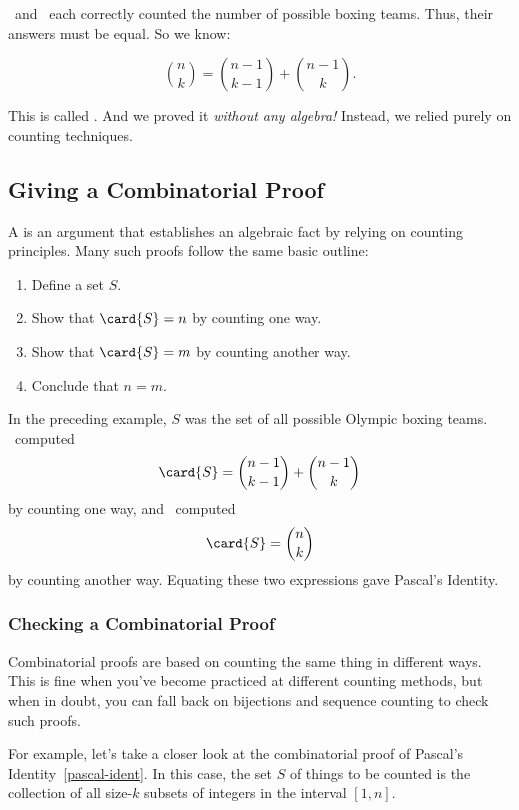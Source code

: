 \Jer\ and \Jay\ each correctly counted the number of possible boxing
teams.  Thus, their answers must be equal.  So we know:
%
\begin{lemma}
\begin{equation}\label{pascal-ident}
    \binom{n}{k} = \binom{n-1}{k-1} + \binom{n - 1}{k}.
\end{equation}
\end{lemma}
%
This is called .  And we proved it
\emph{without any algebra!}  Instead, we relied purely on counting
techniques.


\subsection{Giving a Combinatorial Proof}

A  is an argument that establishes an
algebraic fact by relying on counting principles.  Many such proofs
follow the same basic outline:
%
\begin{enumerate}

\item Define a set $S$.

\item Show that $\card{S} = n$ by counting one way.

\item Show that $\card{S} = m$ by counting another way.

\item Conclude that $n = m$.

\end{enumerate}
%
In the preceding example, $S$ was the set of all possible Olympic boxing
teams.  \Jay\ computed
\[
\card{S} = \binom{n-1}{k-1} + \binom{n-1}{k}
\]
by counting one way, and \Jer\ computed
\[
\card{S} = \binom{n}{k}
\]
by counting another way.  Equating these two expressions gave Pascal's
Identity.

\subsubsection{Checking a Combinatorial Proof}

Combinatorial proofs are based on counting the same thing in different
ways.  This is fine when you've become practiced at different counting
methods, but when in doubt, you can fall back on bijections and
sequence counting to check such proofs.

For example, let's take a closer look at the combinatorial proof of
Pascal's Identity~\eqref{pascal-ident}.  In this case, the set $S$ of
things to be counted is the collection of all size-$k$ subsets of
integers in the interval $[1,n]$.

